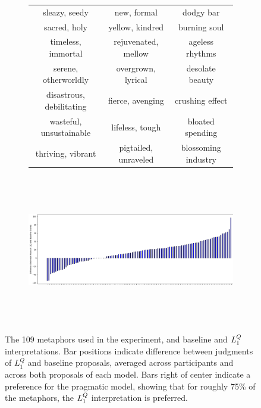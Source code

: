 \documentclass[9pt,twocolumn,twoside,lineno]{pnas-new}
\newcommand{\Listener}{L}
\newcommand{\QLONE}{\Listener_{{1}}^{{Q}}}
\begin{document}
\begin{figure}
\begin{subfigure}{0.3\textwidth}
\begin{center}
\begin{tabular}{ c | c | c  }
			\tiny sleazy, seedy & \tiny new, formal & \tiny dodgy bar\\
			\tiny sacred, holy & \tiny yellow, kindred & \tiny burning soul\\
			\tiny timeless, immortal & \tiny rejuvenated, mellow & \tiny ageless rhythms\\
			\tiny serene, otherworldly & \tiny overgrown, lyrical & \tiny desolate beauty\\
			\tiny disastrous, debilitating & \tiny fierce, avenging & \tiny crushing effect\\
			\tiny wasteful, unsustainable & \tiny lifeless, tough & \tiny bloated spending\\
			\tiny thriving, vibrant & \tiny pigtailed, unraveled & \tiny blossoming industry\\
			 
			\end{tabular}
			\end{center}
		\end{subfigure}\begin{subfigure}{0.5\textwidth}
			\vspace*{-1.3cm}\hspace{6em}\includegraphics[width=18.9cm,height=6.5cm,angle=270]{images/resultsbarplot.png}
		\end{subfigure}
			\caption{The 109 metaphors used in the experiment, and baseline and $\protect\QLONE$ interpretations. Bar positions indicate difference between judgments of $\QLONE$ and baseline proposals, averaged across participants and across both proposals of each model. Bars right of center indicate a preference for the pragmatic model, showing that for roughly 75\% of the metaphors, the $\protect\QLONE$ interpretation is preferred.
			}
			\label{fig:barplot}
		\end{figure}
\end{document}
